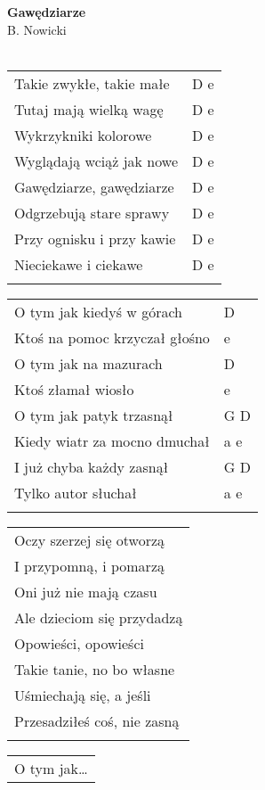 \documentclass[a5paper]{article}
\begin{document}


\noindent
\fontsize{12pt}{15pt}\selectfont
\textbf{Gawędziarze} \\
\fontsize{8pt}{10pt}\selectfont
B. Nowicki \\ \\
\fontsize{10pt}{12pt}\selectfont
{}
\begin{tabular}{@{}p{8.50cm}p{3cm}@{}}
\noindent
Takie zwykłe, takie małe & D e \\
Tutaj mają wielką wagę & D e \\
Wykrzykniki kolorowe & D e \\
Wyglądają wciąż jak nowe & D e \\
Gawędziarze, gawędziarze & D e \\
Odgrzebują stare sprawy & D e \\
Przy ognisku i przy kawie & D e \\
Nieciekawe i ciekawe & D e \\ \\
\end{tabular}

\noindent
\begin{tabular}{@{}p{7.50cm}p{3cm}@{}}
O tym jak kiedyś w górach & D \\
Ktoś na pomoc krzyczał głośno & e \\
O tym jak na mazurach & D \\
Ktoś złamał wiosło & e \\
O tym jak patyk trzasnął & G D \\
Kiedy wiatr za mocno dmuchał & a e \\
I już chyba każdy zasnął & G D \\
Tylko autor słuchał & a e \\ \\
\end{tabular}

\noindent
\begin{tabular}{@{}p{8.50cm}@{}}
Oczy szerzej się otworzą \\
I przypomną, i pomarzą \\
Oni już nie mają czasu \\
Ale dzieciom się przydadzą \\
Opowieści, opowieści \\
Takie tanie, no bo własne \\
Uśmiechają się, a jeśli \\
Przesadziłeś coś, nie zasną \\ \\
\end{tabular}

\noindent
\begin{tabular}{@{}p{7.50cm}@{}}
O tym jak…
\end{tabular}
\end{document}

